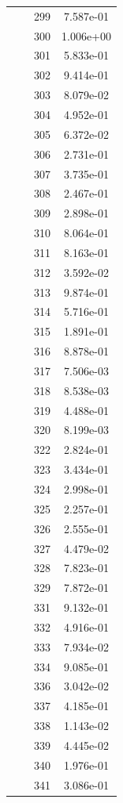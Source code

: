 \documentclass[12pt]{article}
\begin{document}
\begin{longtable}{@{}cccc@{}}
 &  & 299 & 7.587e-01 \\
 &  & 300 & 1.006e+00 \\
 &  & 301 & 5.833e-01 \\
 &  & 302 & 9.414e-01 \\
 &  & 303 & 8.079e-02 \\
 &  & 304 & 4.952e-01 \\
 &  & 305 & 6.372e-02 \\
 &  & 306 & 2.731e-01 \\
 &  & 307 & 3.735e-01 \\
 &  & 308 & 2.467e-01 \\
 &  & 309 & 2.898e-01 \\
 &  & 310 & 8.064e-01 \\
 &  & 311 & 8.163e-01 \\
 &  & 312 & 3.592e-02 \\
 &  & 313 & 9.874e-01 \\
 &  & 314 & 5.716e-01 \\
 &  & 315 & 1.891e-01 \\
 &  & 316 & 8.878e-01 \\
 &  & 317 & 7.506e-03 \\
 &  & 318 & 8.538e-03 \\
 &  & 319 & 4.488e-01 \\
 &  & 320 & 8.199e-03 \\
 &  & 322 & 2.824e-01 \\
 &  & 323 & 3.434e-01 \\
 &  & 324 & 2.998e-01 \\
 &  & 325 & 2.257e-01 \\
 &  & 326 & 2.555e-01 \\
 &  & 327 & 4.479e-02 \\
 &  & 328 & 7.823e-01 \\
 &  & 329 & 7.872e-01 \\
 &  & 331 & 9.132e-01 \\
 &  & 332 & 4.916e-01 \\
 &  & 333 & 7.934e-02 \\
 &  & 334 & 9.085e-01 \\
 &  & 336 & 3.042e-02 \\
 &  & 337 & 4.185e-01 \\
 &  & 338 & 1.143e-02 \\
 &  & 339 & 4.445e-02 \\
 &  & 340 & 1.976e-01 \\
 &  & 341 & 3.086e-01 \\

\end{longtable}
\end{document}
